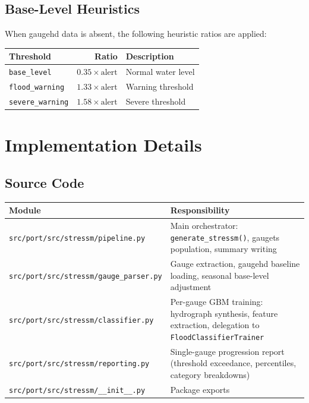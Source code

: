 \documentclass[11pt,a4paper]{article}
\begin{document}
\subsection{Base-Level Heuristics}

When gaugehd data is absent, the following heuristic ratios are applied:

\begin{center}
\begin{tabular}{lrl}
\toprule
\textbf{Threshold} & \textbf{Ratio} & \textbf{Description} \\
\midrule
\texttt{base\_level} & $0.35 \times \text{alert}$ & Normal water level \\
\texttt{flood\_warning} & $1.33 \times \text{alert}$ & Warning threshold \\
\texttt{severe\_warning} & $1.58 \times \text{alert}$ & Severe threshold \\
\bottomrule
\end{tabular}
\end{center}

\section{Implementation Details}

\subsection{Source Code}

\begin{center}
\begin{tabular}{lp{9cm}}
\toprule
\textbf{Module} & \textbf{Responsibility} \\
\midrule
\texttt{src/port/src/stressm/pipeline.py} &
    Main orchestrator: \texttt{generate\_stressm()}, gaugets population,
    summary writing \\
\texttt{src/port/src/stressm/gauge\_parser.py} &
    Gauge extraction, gaugehd baseline loading, seasonal base-level
    adjustment \\
\texttt{src/port/src/stressm/classifier.py} &
    Per-gauge GBM training: hydrograph synthesis, feature extraction,
    delegation to \texttt{FloodClassifierTrainer} \\
\texttt{src/port/src/stressm/reporting.py} &
    Single-gauge progression report (threshold exceedance, percentiles,
    category breakdowns) \\
\texttt{src/port/src/stressm/\_\_init\_\_.py} &
    Package exports \\
\bottomrule
\end{tabular}
\end{center}
\end{document}
